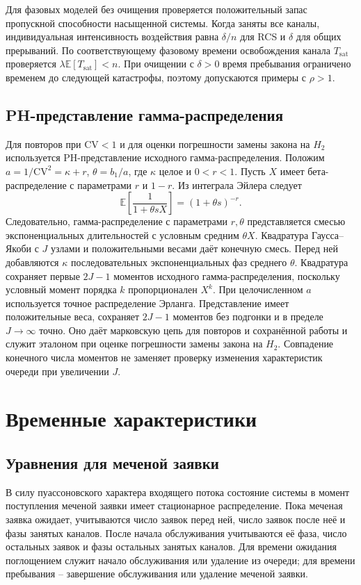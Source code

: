 \documentclass[a4paper,12pt]{article}
\begin{document}
Для фазовых моделей без очищения проверяется положительный запас пропускной способности насыщенной системы. Когда заняты все каналы, индивидуальная интенсивность воздействия равна \(\delta/n\) для RCS и \(\delta\) для общих прерываний. По соответствующему фазовому времени освобождения канала \(T_{\mathrm{sat}}\) проверяется \(\lambda\mathbb E[T_{\mathrm{sat}}]<n\). При очищении с \(\delta>0\) время пребывания ограничено временем до следующей катастрофы, поэтому допускаются примеры с \(\rho>1\).

\subsection{PH-представление гамма-распределения}
Для повторов при \(\mathrm{CV}<1\) и для оценки погрешности замены закона на \(H_2\) используется PH-представление исходного гамма-распределения. Положим \(a=1/\mathrm{CV}^2=\kappa+r\), \(\theta=b_1/a\), где \(\kappa\) целое и \(0<r<1\). Пусть \(X\) имеет бета-распределение с параметрами \(r\) и \(1-r\). Из интеграла Эйлера \cite{nistdlmf} следует
\[
\mathbb E\!\left[\frac{1}{1+\theta sX}\right]=(1+\theta s)^{-r}.
\]
Следовательно, гамма-распределение с параметрами \(r,\theta\) представляется смесью экспоненциальных длительностей с условным средним \(\theta X\). Квадратура Гаусса--Якоби с \(J\) узлами и положительными весами даёт конечную смесь. Перед ней добавляются \(\kappa\) последовательных экспоненциальных фаз среднего \(\theta\). Квадратура сохраняет первые \(2J-1\) моментов исходного гамма-распределения, поскольку условный момент порядка \(k\) пропорционален \(X^k\). При целочисленном \(a\) используется точное распределение Эрланга. Представление имеет положительные веса, сохраняет \(2J-1\) моментов без подгонки и в пределе \(J\to\infty\) точно. Оно даёт марковскую цепь для повторов и сохранённой работы и служит эталоном при оценке погрешности замены закона на \(H_2\). Совпадение конечного числа моментов не заменяет проверку изменения характеристик очереди при увеличении \(J\).


\section{Временные характеристики}\label{sec:times}
\subsection{Уравнения для меченой заявки}
В силу пуассоновского характера входящего потока состояние системы в момент поступления меченой заявки имеет стационарное распределение. Пока меченая заявка ожидает, учитываются число заявок перед ней, число заявок после неё и фазы занятых каналов. После начала обслуживания учитываются её фаза, число остальных заявок и фазы остальных занятых каналов. Для времени ожидания поглощением служит начало обслуживания или удаление из очереди; для времени пребывания -- завершение обслуживания или удаление меченой заявки.
\end{document}
